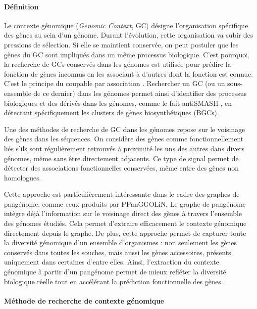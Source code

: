 \paragraph{Définition}

Le contexte génomique (\textit{Genomic Context}, GC) désigne l’organisation spécifique des gènes au sein d’un génome. Durant l'évolution, cette organisation va subir des pressions de sélection. Si elle se maintient conservée, on peut postuler que les gènes du GC sont impliqués dans un même processus biologique. C'est pourquoi, la recherche de GCs conservés dans les génomes est utilisée pour prédire la fonction de gènes inconnus en les associant à d'autres dont la fonction est connue. C'est le principe du coupable par association \cite{aravind_guilt_2000}. Rechercher un GC (ou un sous-ensemble de ce dernier) dans les génomes permet ainsi d'identifier des processus biologiques et des dérivés dans les génomes, comme le fait antiSMASH \cite{medema_antismash_2011}, en détectant spécifiquement les clusters de gènes biosynthétiques (BGCs).

\newpage

Une des méthodes de recherche de GC dans les génomes repose sur le voisinage des gènes dans les séquences. On considère des gènes comme fonctionnellement liés s’ils sont régulièrement retrouvés à proximité les uns des autres dans divers génomes, même sans être directement adjacents. Ce type de signal permet de détecter des associations fonctionnelles conservées, même entre des gènes non homologues. 

Cette approche est particulièrement intéressante dans le cadre des graphes de pangénome, comme ceux produits par PPanGGOLiN. Le graphe de pangénome intègre déjà l’information sur le voisinage direct des gènes à travers l’ensemble des génomes étudiés. Cela permet d’extraire efficacement le contexte génomique directement depuis le graphe. De plus, cette approche permet de capturer toute la diversité génomique d’un ensemble d’organismes : non seulement les gènes conservés dans toutes les souches, mais aussi les gènes accessoires, présents uniquement dans certaines d’entre elles. Ainsi, l’extraction du contexte génomique à partir d’un pangénome permet de mieux refléter la diversité biologique réelle tout en accélérant la prédiction fonctionnelle des gènes.

\paragraph{Méthode de recherche de contexte génomique}

